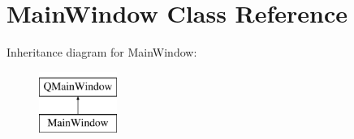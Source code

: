 \hypertarget{classMainWindow}{\section{Main\-Window Class Reference}
\label{classMainWindow}
}
Inheritance diagram for Main\-Window\-:\begin{figure}[H]
\begin{center}
\leavevmode
\includegraphics[height=2.000000cm]{d6/d1a/classMainWindow}
\end{center}
\end{figure}
